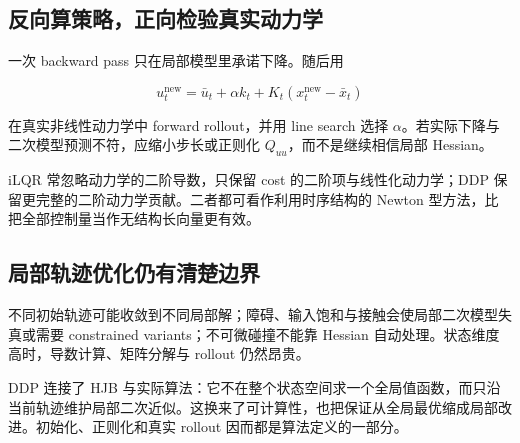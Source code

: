 \subsection{反向算策略，正向检验真实动力学}

一次 backward pass 只在局部模型里承诺下降。随后用

\[
u_t^{\text{new}}
=\bar u_t+\alpha k_t+K_t(x_t^{\text{new}}-\bar x_t)
\]

在真实非线性动力学中 forward rollout，并用 line search 选择 \(\alpha\)。若实际下降与二次模型预测不符，应缩小步长或正则化 \(Q_{uu}\)，而不是继续相信局部 Hessian。

iLQR 常忽略动力学的二阶导数，只保留 cost 的二阶项与线性化动力学；DDP 保留更完整的二阶动力学贡献。二者都可看作利用时序结构的 Newton 型方法，比把全部控制量当作无结构长向量更有效。

\subsection{局部轨迹优化仍有清楚边界}

不同初始轨迹可能收敛到不同局部解；障碍、输入饱和与接触会使局部二次模型失真或需要 constrained variants；不可微碰撞不能靠 Hessian 自动处理。状态维度高时，导数计算、矩阵分解与 rollout 仍然昂贵。

DDP 连接了 HJB 与实际算法：它不在整个状态空间求一个全局值函数，而只沿当前轨迹维护局部二次近似。这换来了可计算性，也把保证从全局最优缩成局部改进。初始化、正则化和真实 rollout 因而都是算法定义的一部分。
